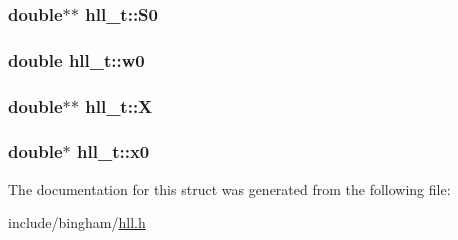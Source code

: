 \label{structhll__t_ac5c63b436a9f5afb3b7887297a053a8b}
\hypertarget{structhll__t_ab2ecb1d2e395a0b6ba98689ba1693a30}{
\subsubsection[{S0}]{\setlength{\rightskip}{0pt plus 5cm}double$\ast$$\ast$ {\bf hll\_\-t::S0}}}
\label{structhll__t_ab2ecb1d2e395a0b6ba98689ba1693a30}
\hypertarget{structhll__t_ad2da9daf578727a5351db6fade835955}{
\subsubsection[{w0}]{\setlength{\rightskip}{0pt plus 5cm}double {\bf hll\_\-t::w0}}}
\label{structhll__t_ad2da9daf578727a5351db6fade835955}
\hypertarget{structhll__t_a7bced271805f271554e0ce7e532303fd}{
\subsubsection[{X}]{\setlength{\rightskip}{0pt plus 5cm}double$\ast$$\ast$ {\bf hll\_\-t::X}}}
\label{structhll__t_a7bced271805f271554e0ce7e532303fd}
\hypertarget{structhll__t_a1c0afe48b6612261538a0f170e7170a7}{
\subsubsection[{x0}]{\setlength{\rightskip}{0pt plus 5cm}double$\ast$ {\bf hll\_\-t::x0}}}
\label{structhll__t_a1c0afe48b6612261538a0f170e7170a7}


The documentation for this struct was generated from the following file:\begin{DoxyCompactItemize}
\item 
include/bingham/\hyperlink{hll_8h}{hll.h}\end{DoxyCompactItemize}
